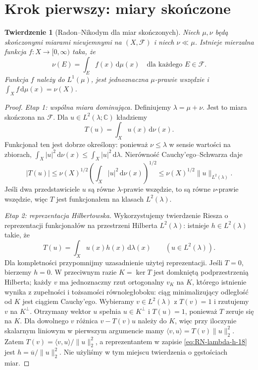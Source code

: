 \documentclass[11pt,a4paper,oneside]{book}
\numberwithin{equation}{chapter}
\theoremstyle{plain}
\newtheorem{twierdzenie}{Twierdzenie}[chapter]
\theoremstyle{definition}
\theoremstyle{remark}
\begin{document}
\section{Krok pierwszy: miary skończone}
\begin{twierdzenie}[Radon--Nikodym dla miar skończonych]
\label{thm:RN-finite-18}
Niech $\mu,\nu$ będą skończonymi miarami nieujemnymi
na $(X,\mathcal F)$ i niech $\nu\ll\mu$.
Istnieje mierzalna funkcja $f:X\to[0,\infty)$ taka, że
\begin{equation}\label{eq:RN-finite-18}
\nu(E)=\int_E f(x)\,\mathrm d\mu(x)
\quad\text{dla każdego }E\in\mathcal F.
\end{equation}
Funkcja $f$ należy do $L^1(\mu)$, jest jednoznaczna
$\mu$-prawie wszędzie i
$\int_Xf\,\mathrm d\mu(x)=\nu(X)$.
\end{twierdzenie}
\begin{proof}
\emph{Etap 1: wspólna miara dominująca.}
Definiujemy $\lambda=\mu+\nu$. Jest to miara skończona
na $\mathcal F$. Dla $u\in L^2(\lambda;\mathbb C)$
kładziemy
\[
T(u)=\int_X u(x)\,\mathrm d\nu(x).
\]
Funkcjonał ten jest dobrze określony: ponieważ
$\nu\le\lambda$ w sensie wartości na zbiorach,
$\int_X|u|^2\,\mathrm d\nu(x)\le
\int_X|u|^2\,\mathrm d\lambda$.
Nierówność Cauchy'ego--Schwarza daje
\[
|T(u)|\le\nu(X)^{1/2}
\left(\int_X|u|^2\,\mathrm d\nu(x)\right)^{1/2}
\le\nu(X)^{1/2}\|u\|_{L^2(\lambda)}.
\]
Jeśli dwa przedstawiciele $u$ są równe $\lambda$-prawie
wszędzie, to są równe $\nu$-prawie wszędzie, więc
$T$ jest funkcjonałem na klasach $L^2(\lambda)$.

\emph{Etap 2: reprezentacja Hilbertowska.}
Wykorzystujemy twierdzenie Riesza o reprezentacji
funkcjonałów na przestrzeni Hilberta $L^2(\lambda)$:
istnieje $h\in L^2(\lambda)$ takie, że
\begin{equation}\label{eq:RN-lambda-h-18}
T(u)=\int_Xu(x)h(x)\,\mathrm d\lambda(x)
\qquad(u\in L^2(\lambda)).
\end{equation}
Dla kompletności przypomnijmy uzasadnienie użytej
reprezentacji. Jeśli $T=0$, bierzemy $h=0$.
W przeciwnym razie $K=\ker T$ jest domkniętą
podprzestrzenią Hilberta; każdy $v$ ma jednoznaczny
rzut ortogonalny $v_K$ na $K$, którego istnienie wynika
z zupełności i tożsamości równoległoboku: ciąg
minimalizujący odległość od $K$ jest ciągiem Cauchy'ego.
Wybieramy $v\in L^2(\lambda)$ z $T(v)=1$ i rzutujemy
$v$ na $K^\perp$. Otrzymany wektor $u$ spełnia
$u\in K^\perp$ i $T(u)=1$, ponieważ $T$ zeruje się na $K$.
Dla dowolnego $v$ różnica $v-T(v)u$ należy do $K$,
więc przy iloczynie skalarnym liniowym w pierwszym
argumencie mamy
$\langle v,u\rangle=T(v)\|u\|_2^2$.
Zatem $T(v)=\langle v,u\rangle/\|u\|_2^2$,
a reprezentantem w zapisie \eqref{eq:RN-lambda-h-18}
jest $h=\overline u/\|u\|_2^2$.
Nie użyliśmy w tym miejscu twierdzenia o gęstościach miar.


\end{proof}
\end{document}
